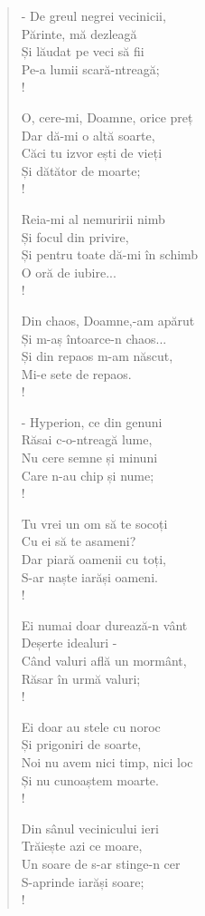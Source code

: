 \documentclass{article}
\begin{document}
\begin{small}
\begin{multicols}{3}
\begin{verse}
- De greul negrei vecinicii, \\
Părinte, mă dezleagă \\
Și lăudat pe veci să fii \\
Pe-a lumii scară-ntreagă; \\!

O, cere-mi, Doamne, orice preț \\
Dar dă-mi o altă soarte, \\
Căci tu izvor ești de vieți \\
Și dătător de moarte; \\!

Reia-mi al nemuririi nimb \\
Și focul din privire, \\
Și pentru toate dă-mi în schimb \\
O oră de iubire... \\!

Din chaos, Doamne,-am apărut \\
Și m-aș întoarce-n chaos... \\
Și din repaos m-am născut, \\
Mi-e sete de repaos. \\!

- Hyperion, ce din genuni \\
Răsai c-o-ntreagă lume, \\
Nu cere semne și minuni \\
Care n-au chip și nume; \\!

Tu vrei un om să te socoți \\
Cu ei să te asameni? \\
Dar piară oamenii cu toți, \\
S-ar naște iarăși oameni. \\!

Ei numai doar durează-n vânt \\
Deșerte idealuri - \\
Când valuri află un mormânt, \\
Răsar în urmă valuri; \\!

Ei doar au stele cu noroc \\
Și prigoniri de soarte, \\
Noi nu avem nici timp, nici loc \\
Și nu cunoaștem moarte. \\!

Din sânul vecinicului ieri \\
Trăiește azi ce moare, \\
Un soare de s-ar stinge-n cer \\
S-aprinde iarăși soare; \\!


\end{verse}
\end{multicols}
\end{small}
\end{document}
